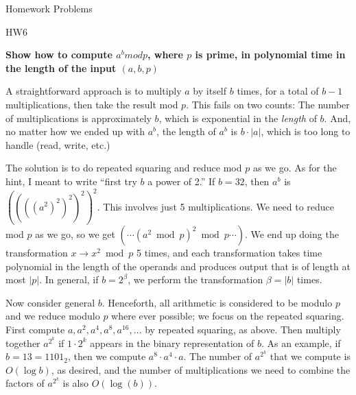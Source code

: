 \documentclass[2pt]{scrartcl}
\makeatletter
\renewcommand{\section}{\@startsection{section}{1}{0mm}
  {-1ex plus -.5ex minus -.2ex}
  {0.5ex plus .2ex}
{\normalfont\large\bfseries}}
\renewcommand{\subsection}{\@startsection{subsection}{2}{0mm}
  {-1explus -.5ex minus -.2ex}
  {0.5ex plus .2ex}
{\normalfont\normalsize\bfseries}}
\makeatother
\begin{document}
\begin{multicols}{6}
  \section{Homework Problems}

  \subsection{HW6}

  {\bf Show how to compute $a^b mod p$, where $p$ is prime, in polynomial time in the length of the input $(a, b, p)$}

  A straightforward approach is to multiply $a$ by itself $b$
  times, for a total of $b-1$ multiplications, then take the result mod
  $p$.  This fails on two counts:  The number of multiplications is
  approximately $b$, which is exponential in the {\em length} of $b$.
  And, no matter how we ended up with $a^b$, the length of $a^b$ is
  $b\cdot|a|$, which is too long to handle (read, write, etc.)

  The solution is to do repeated squaring and reduce mod $p$ as we go.
  As for the hint, I meant to write ``first try $b$ a power of 2.''  If
  $b=32$, then $a^b$ is $((((a^2)^2)^2)^2)^2$.  This involves just 5
  multiplications.  We need to reduce mod $p$ as we go, so we get
  $(\cdots(a^2\bmod p)^2\bmod p\cdots)$.  We end up doing the
  transformation $x\to x^2\bmod p$ 5 times, and each transformation
  takes time polynomial in the length of the operands and produces
  output that is of length at most $|p|$.  In general, if $b=2^\beta$,
  we perform the transformation $\beta=|b|$ times.

  Now consider general $b$.  Henceforth, all arithmetic is considered to
  be modulo $p$ and we reduce modulo $p$ where ever possible; we focus
  on the repeated squaring.  First compute $a,a^2,a^4,a^8,a^{16},\ldots$
  by repeated squaring, as above.  Then multiply together $a^{2^k}$ if
  $1\cdot 2^k$ appears in the binary representation of $b$.  As an
  example, if $b=13=1101_2$, then we compute $a^8\cdot a^4\cdot a$.  The
  number of $a^{2^k}$ that we compute is $O(\log b)$, as desired, and
  the number of multiplications we need to combine the factors of
  $a^{2^k}$ is also $O(\log(b))$.


\end{multicols}
\end{document}
